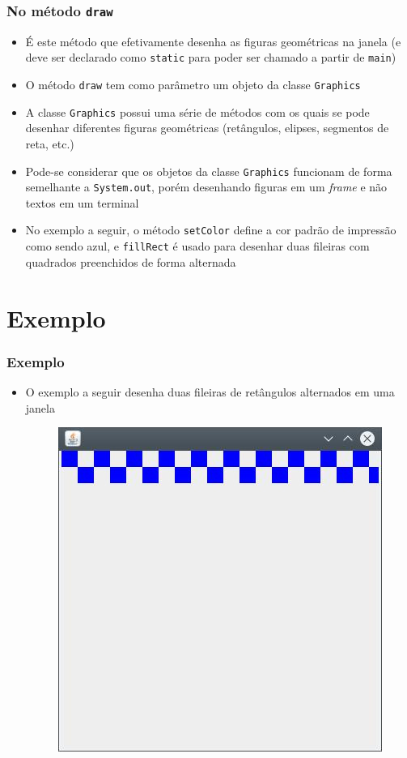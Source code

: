 \documentclass[xcolor={dvipsnames,table},aspectratio=169]{beamer}
\begin{document}
\begin{frame}\frametitle{No método \texttt{draw}}
\begin{itemize}
	\item É este método que efetivamente desenha as figuras geométricas na janela (e deve ser declarado como \texttt{static} para poder ser chamado a partir de \texttt{main})
	\item O método \texttt{draw} tem como parâmetro um objeto da classe \texttt{Graphics}
	\item A classe \texttt{Graphics} possui uma série de métodos com os quais se pode desenhar diferentes figuras geométricas (retângulos, elipses, segmentos de reta, etc.)
	\item Pode-se considerar que os objetos da classe \texttt{Graphics} funcionam de forma semelhante a \texttt{System.out}, porém desenhando figuras em um \emph{frame} e não textos em um terminal
	\item No exemplo a seguir, o método \texttt{setColor} define a cor padrão de impressão como sendo azul, e \texttt{fillRect} é usado para desenhar duas fileiras com quadrados preenchidos de forma alternada
	\end{itemize}
\end{frame}

\section{Exemplo}

\begin{frame}\frametitle{Exemplo}
\begin{itemize}
	\item O exemplo a seguir desenha duas fileiras de retângulos alternados em uma janela
\begin{figure}[h]	
	\includegraphics[height=0.6\paperheight,center]{pucrs-ep-fprog-unidade_04-graficos_em_java-laminas-exemplo.jpg}
\end{figure}
\end{itemize}
\end{frame}
\end{document}
